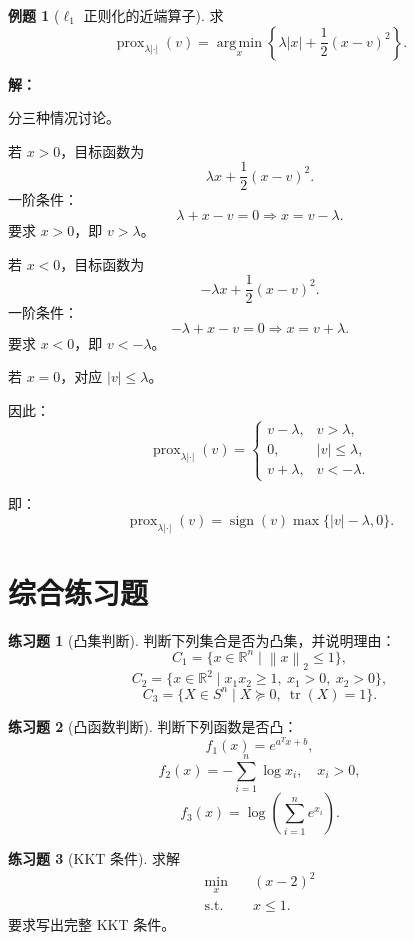 \documentclass[11pt,a4paper]{ctexart}
\newcommand{\R}{\mathbb{R}}
\newcommand{\tr}{\operatorname{tr}}
\newcommand{\prox}{\operatorname{prox}}
\newcommand{\argmin}{\operatorname*{arg\,min}}
\newcommand{\st}{\text{s.t.}}
\newcommand{\norm}[1]{\left\lVert #1 \right\rVert}
\theoremstyle{definition}
\newtheorem{example}{例题}[section]
\newtheorem{exercise}{练习题}[section]
\theoremstyle{plain}
\theoremstyle{remark}
\begin{document}
\begin{example}[$\ell_1$ 正则化的近端算子]
求
\[
    \prox_{\lambda |\cdot|}(v)
    =
    \argmin_x
    \left\{
    \lambda |x|+\frac12(x-v)^2
    \right\}.
\]

\textbf{解：}

分三种情况讨论。

若 $x>0$，目标函数为
\[
    \lambda x+\frac12(x-v)^2.
\]
一阶条件：
\[
    \lambda+x-v=0
    \Rightarrow
    x=v-\lambda.
\]
要求 $x>0$，即 $v>\lambda$。

若 $x<0$，目标函数为
\[
    -\lambda x+\frac12(x-v)^2.
\]
一阶条件：
\[
    -\lambda+x-v=0
    \Rightarrow
    x=v+\lambda.
\]
要求 $x<0$，即 $v<-\lambda$。

若 $x=0$，对应 $|v|\le\lambda$。

因此：
\[
    \prox_{\lambda |\cdot|}(v)
    =
    \begin{cases}
        v-\lambda, & v>\lambda,\\
        0, & |v|\le\lambda,\\
        v+\lambda, & v<-\lambda.
    \end{cases}
\]

即：
\[
    \prox_{\lambda |\cdot|}(v)
    =
    \operatorname{sign}(v)\max\{|v|-\lambda,0\}.
\]
\end{example}

\section{综合练习题}

\begin{exercise}[凸集判断]
判断下列集合是否为凸集，并说明理由：
\[
    C_1=\{x\in\R^n\mid \norm{x}_2\le1\},
\]
\[
    C_2=\{x\in\R^2\mid x_1x_2\ge1,\ x_1>0,\ x_2>0\},
\]
\[
    C_3=\{X\in S^n\mid X\succeq0,\ \tr(X)=1\}.
\]
\end{exercise}

\begin{exercise}[凸函数判断]
判断下列函数是否凸：
\[
    f_1(x)=e^{a^Tx+b},
\]
\[
    f_2(x)=-\sum_{i=1}^n \log x_i,\quad x_i>0,
\]
\[
    f_3(x)=\log\left(\sum_{i=1}^n e^{x_i}\right).
\]
\end{exercise}

\begin{exercise}[KKT 条件]
求解
\[
\begin{aligned}
    \min_x\quad & (x-2)^2\\
    \st\quad & x\le1.
\end{aligned}
\]
要求写出完整 KKT 条件。
\end{exercise}
\end{document}
